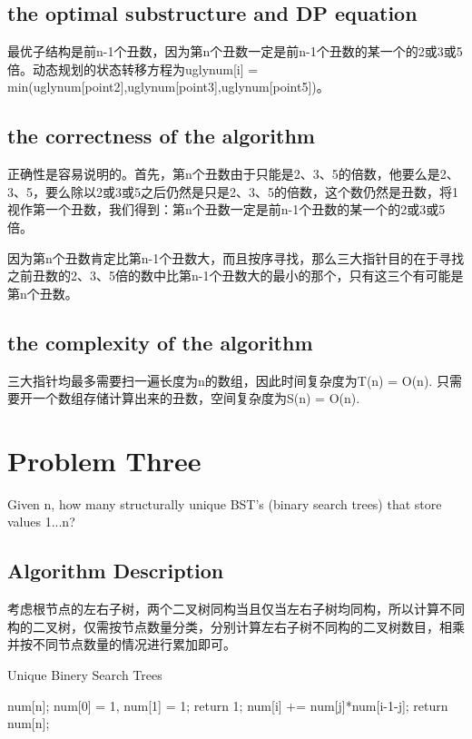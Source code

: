 \documentclass{article}
\begin{document}
\subsection{the optimal substructure and DP equation}
最优子结构是前n-1个丑数，因为第n个丑数一定是前n-1个丑数的某一个的2或3或5倍。动态规划的状态转移方程为uglynum[i] = min(uglynum[point2],uglynum[point3],uglynum[point5])。
\subsection{the correctness of the algorithm}
正确性是容易说明的。首先，第n个丑数由于只能是2、3、5的倍数，他要么是2、3、5，要么除以2或3或5之后仍然是只是2、3、5的倍数，这个数仍然是丑数，将1视作第一个丑数，我们得到：第n个丑数一定是前n-1个丑数的某一个的2或3或5倍。


因为第n个丑数肯定比第n-1个丑数大，而且按序寻找，那么三大指针目的在于寻找之前丑数的2、3、5倍的数中比第n-1个丑数大的最小的那个，只有这三个有可能是第n个丑数。
\subsection{the complexity of the algorithm}
三大指针均最多需要扫一遍长度为n的数组，因此时间复杂度为T(n) = O(n).
只需要开一个数组存储计算出来的丑数，空间复杂度为S(n) = O(n).





\newpage
\section{Problem Three}
Given n, how many structurally unique BST’s (binary search trees) that store values 1...n?
\subsection{Algorithm Description}
考虑根节点的左右子树，两个二叉树同构当且仅当左右子树均同构，所以计算不同构的二叉树，仅需按节点数量分类，分别计算左右子树不同构的二叉树数目，相乘并按不同节点数量的情况进行累加即可。
\begin{algorithm}[htbp]  
  \caption{Unique Binery Search Trees}  
  \begin{algorithmic}[1] 
   \State num[n];
   \State num[0] = 1, num[1] = 1;
	 \State return 1; 
      \EndIf
      \State num[i] += num[j]*num[i-1-j];
      \EndFor
      \EndFor
      \State return num[n]; 
    \EndFunction  
  \end{algorithmic}  
\end{algorithm} 
\newpage
\end{document}
